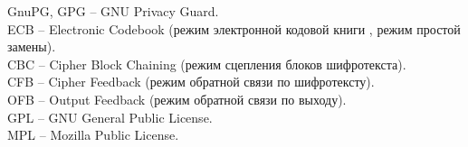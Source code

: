 \newpage
{}

\noindent
GnuPG, GPG -- GNU Privacy Guard.\\
ECB -- Electronic Codebook (режим электронной кодовой книги , режим простой замены).\\
CBC -- Cipher Block Chaining (режим сцепления блоков шифротекста).\\
CFB -- Cipher Feedback (режим обратной связи по шифротексту).\\
OFB -- Output Feedback (режим обратной связи по выходу).\\
GPL -- GNU General Public License.\\
MPL -- Mozilla Public License.
